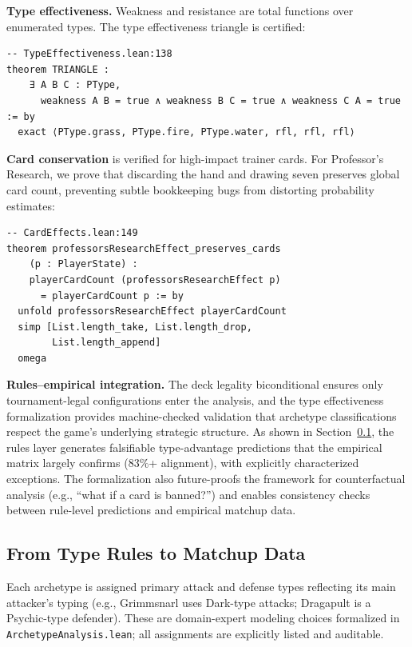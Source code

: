 \documentclass[journal]{IEEEtran}
\let\origsubsection\subsection
\renewcommand{\subsection}{\needspace{3\baselineskip}\origsubsection}
\begin{document}
\textbf{Type effectiveness.}
Weakness and resistance are total functions over enumerated types.
The type effectiveness triangle is certified:

\begin{lstlisting}[caption={Type-effectiveness triangle: weakness is non-transitive.},label={lst:triangle}]
-- TypeEffectiveness.lean:138
theorem TRIANGLE :
    ∃ A B C : PType,
      weakness A B = true ∧ weakness B C = true ∧ weakness C A = true := by
  exact ⟨PType.grass, PType.fire, PType.water, rfl, rfl, rfl⟩
\end{lstlisting}

\textbf{Card conservation} is verified for high-impact trainer cards.
For Professor's Research, we prove that discarding the hand and drawing seven preserves global card count, preventing subtle bookkeeping bugs from distorting probability estimates:

\begin{lstlisting}[caption={Card-conservation proof for Professor's Research.},label={lst:cardcons}]
-- CardEffects.lean:149
theorem professorsResearchEffect_preserves_cards
    (p : PlayerState) :
    playerCardCount (professorsResearchEffect p)
      = playerCardCount p := by
  unfold professorsResearchEffect playerCardCount
  simp [List.length_take, List.length_drop,
        List.length_append]
  omega
\end{lstlisting}

\textbf{Rules--empirical integration.}
The deck legality biconditional ensures only tournament-legal configurations enter the analysis, and the type effectiveness formalization provides machine-checked validation that archetype classifications respect the game's underlying strategic structure.
As shown in Section~\ref{subsec:typealignment}, the rules layer generates falsifiable type-advantage predictions that the empirical matrix largely confirms (83\%+ alignment), with explicitly characterized exceptions.
The formalization also future-proofs the framework for counterfactual analysis (e.g., ``what if a card is banned?'') and enables consistency checks between rule-level predictions and empirical matchup data.

\subsection{From Type Rules to Matchup Data}\label{subsec:typealignment}

Each archetype is assigned primary attack and defense types reflecting its main attacker's typing (e.g., Grimmsnarl uses Dark-type attacks; Dragapult is a Psychic-type defender).
These are domain-expert modeling choices formalized in \texttt{ArchetypeAnalysis.lean}; all assignments are explicitly listed and auditable.
\end{document}
